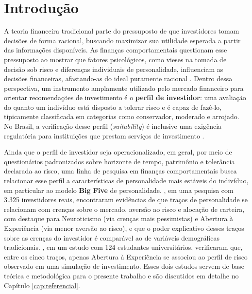 \chapter{Introdução}
\label{cap:introducao}

A teoria financeira tradicional parte do pressuposto de que investidores
tomam decisões de forma racional, buscando maximizar sua utilidade
esperada a partir das informações disponíveis. As finanças comportamentais
questionam esse pressuposto ao mostrar que fatores psicológicos, como
vieses na tomada de decisão sob risco e diferenças individuais de
personalidade, influenciam as decisões financeiras, afastando-as do
ideal puramente racional \cite{debortoli2019,jiangpengyan2024}. Dentro dessa perspectiva,
um instrumento amplamente utilizado pelo mercado financeiro para orientar
recomendações de investimento é o \textbf{perfil de investidor}: uma
avaliação do quanto um indivíduo está disposto a tolerar risco e é capaz
de fazê-lo, tipicamente classificada em categorias como conservador,
moderado e arrojado. No Brasil, a verificação desse perfil
(\textit{suitability}) é inclusive uma exigência regulatória para
instituições que prestam serviços de investimento \cite{cvm30_2021}.

Ainda que o perfil de investidor seja operacionalizado, em geral, por meio
de questionários padronizados sobre horizonte de tempo, patrimônio e
tolerância declarada ao risco, uma linha de pesquisa em finanças
comportamentais busca relacionar esse perfil a características de
personalidade mais estáveis do indivíduo, em particular ao modelo
\textbf{Big Five} de personalidade. , em uma
pesquisa com 3.325 investidores reais, encontraram evidências de que
traços de personalidade se relacionam com crenças sobre o mercado,
aversão ao risco e alocação de carteira, com destaque para Neuroticismo
(via crenças mais pessimistas) e Abertura à Experiência (via menor
aversão ao risco), e que o poder explicativo desses traços sobre as
crenças do investidor é comparável ao de variáveis demográficas
tradicionais. , em um estudo com
124 estudantes universitários, verificaram que, entre os cinco traços,
apenas Abertura à Experiência se associou ao perfil de risco observado em
uma simulação de investimento. Esses dois estudos servem de base teórica
e metodológica para o presente trabalho e são discutidos em detalhe no
Capítulo \ref{cap:referencial}.

